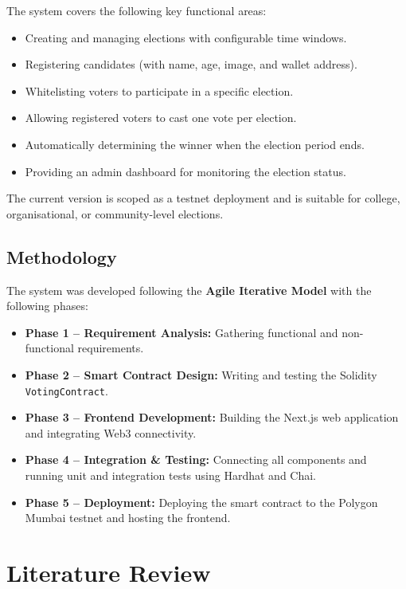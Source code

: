 \documentclass[12pt,a4paper]{report}
\begin{document}
The system covers the following key functional areas:

\begin{itemize}
\item Creating and managing elections with configurable time windows.
\item Registering candidates (with name, age, image, and wallet address).
\item Whitelisting voters to participate in a specific election.
\item Allowing registered voters to cast one vote per election.
\item Automatically determining the winner when the election period ends.
\item Providing an admin dashboard for monitoring the election status.
\end{itemize}

The current version is scoped as a testnet deployment and is suitable for college,
organisational, or community-level elections.

\section{Methodology}

The system was developed following the \textbf{Agile Iterative Model}
with the following phases:

\begin{itemize}
\item \textbf{Phase 1 -- Requirement Analysis:} Gathering functional and
      non-functional requirements.
\item \textbf{Phase 2 -- Smart Contract Design:} Writing and testing the
      Solidity \texttt{VotingContract}.
\item \textbf{Phase 3 -- Frontend Development:} Building the Next.js web application
      and integrating Web3 connectivity.
\item \textbf{Phase 4 -- Integration \& Testing:} Connecting all components and
      running unit and integration tests using Hardhat and Chai.
\item \textbf{Phase 5 -- Deployment:} Deploying the smart contract to the Polygon
      Mumbai testnet and hosting the frontend.
\end{itemize}

\chapter{Literature Review}
\end{document}
